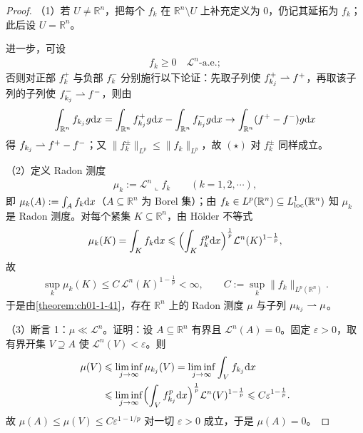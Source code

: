 \documentclass[../../main.tex]{subfiles}%
\begin{document}
\begin{proof}
（1）若 $U\neq\mathbb{R}^n$，把每个 $f_k$ 在 $\mathbb{R}^n\setminus U$ 上补充定义为 $0$，仍记其延拓为 $f_k$；此后设 $U=\mathbb{R}^n$。

进一步，可设
\begin{align*}
f_k\geqslant0\quad\mathcal{L}^n\text{-a.e.};
\end{align*}
否则对正部 $f_k^+$ 与负部 $f_k^-$ 分别施行以下论证：先取子列使 $f_{k_j}^+\rightharpoonup f^+$，再取该子列的子列使 $f_{k_j}^-\rightharpoonup f^-$，则由
\begin{align*}
\int_{\mathbb{R}^n}f_{k_j}g\mathrm{d} x=\int_{\mathbb{R}^n}f_{k_j}^+g\mathrm{d} x-\int_{\mathbb{R}^n}f_{k_j}^-g\mathrm{d} x\to\int_{\mathbb{R}^n}(f^+-f^-)g\mathrm{d} x
\end{align*}
得 $f_{k_j}\rightharpoonup f^+-f^-$；又 $\lVert f_k^\pm\rVert_{L^p}\leqslant\lVert f_k\rVert_{L^p}$，故 $(\star)$ 对 $f_k^\pm$ 同样成立。

（2）定义 Radon 测度
\begin{align*}
\mu_k:=\mathcal{L}^n\llcorner f_k\qquad(k=1,2,\cdots),
\end{align*}
即 $\mu_k(A):=\int_Af_k\mathrm{d} x$（$A\subseteq\mathbb{R}^n$ 为 Borel 集）；由 $f_k\in L^p(\mathbb{R}^n)\subseteq L^1_{\mathrm{loc}}(\mathbb{R}^n)$ 知 $\mu_k$ 是 Radon 测度。对每个紧集 $K\subseteq\mathbb{R}^n$，由 Hölder 不等式
\begin{align*}
\mu_k(K)=\int_Kf_k\mathrm{d} x\leqslant\Bigl(\int_Kf_k^p\mathrm{d} x\Bigr)^{\frac{1}{p}}\mathcal{L}^n(K)^{1-\frac{1}{p}},
\end{align*}
故
\begin{align*}
\sup_k\mu_k(K)\leqslant C\,\mathcal{L}^n(K)^{1-\frac{1}{p}}<\infty,\qquad C:=\sup_k\lVert f_k\rVert_{L^p(\mathbb{R}^n)} .
\end{align*}
于是由\cref{theorem:ch01-1-41}，存在 $\mathbb{R}^n$ 上的 Radon 测度 $\mu$ 与子列 $\mu_{k_j}\rightharpoonup\mu$。%

（3）断言 1：$\mu\ll\mathcal{L}^n$。证明：设 $A\subseteq\mathbb{R}^n$ 有界且 $\mathcal{L}^n(A)=0$。固定 $\varepsilon>0$，取有界开集 $V\supseteq A$ 使 $\mathcal{L}^n(V)<\varepsilon$。则
\begin{align*}
\mu(V)&\leqslant\liminf_{j\to\infty}\mu_{k_j}(V)
=\liminf_{j\to\infty}\int_Vf_{k_j}\mathrm{d} x\\
&\leqslant\liminf_{j\to\infty}\Bigl(\int_Vf_{k_j}^p\mathrm{d} x\Bigr)^{\frac{1}{p}}\mathcal{L}^n(V)^{1-\frac{1}{p}}\leqslant C\varepsilon^{1-\frac{1}{p}}.
\end{align*}
故 $\mu(A)\leqslant\mu(V)\leqslant C\varepsilon^{1-1/p}$ 对一切 $\varepsilon>0$ 成立，于是 $\mu(A)=0$。


\end{proof}
\end{document}
